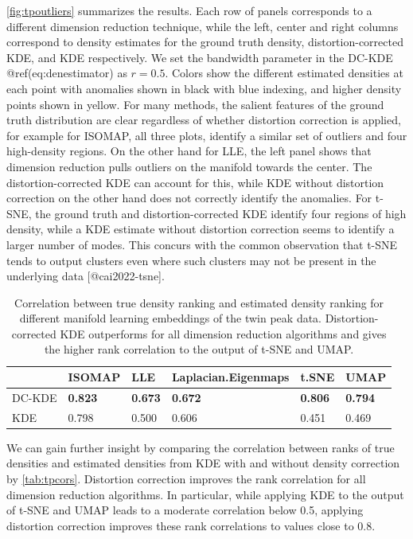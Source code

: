 \documentclass[
]{article}
\begin{document}
\autoref{fig:tpoutliers} summarizes the results. Each row of panels
corresponds to a different dimension reduction technique, while the
left, center and right columns correspond to density estimates for the
ground truth density, distortion-corrected KDE, and KDE respectively. We
set the bandwidth parameter in the DC-KDE @ref(eq:denestimator) as
\(r=0.5\). Colors show the different estimated densities at each point
with anomalies shown in black with blue indexing, and higher density
points shown in yellow. For many methods, the salient features of the
ground truth distribution are clear regardless of whether distortion
correction is applied, for example for ISOMAP, all three plots, identify
a similar set of outliers and four high-density regions. On the other
hand for LLE, the left panel shows that dimension reduction pulls
outliers on the manifold towards the center. The distortion-corrected
KDE can account for this, while KDE without distortion correction on the
other hand does not correctly identify the anomalies. For t-SNE, the
ground truth and distortion-corrected KDE identify four regions of high
density, while a KDE estimate without distortion correction seems to
identify a larger number of modes. This concurs with the common
observation that t-SNE tends to output clusters even where such clusters
may not be present in the underlying data {[}@cai2022-tsne{]}.

\begin{table}

\caption{\label{tab:tpcors}Correlation between true density ranking and estimated density ranking for different manifold learning embeddings of the twin peak data. Distortion-corrected KDE outperforms for all dimension reduction algorithms and gives the higher rank correlation to the output of t-SNE and UMAP.}
\centering
\begin{tabular}[t]{l>{}l>{}l>{}l>{}l>{}l}
\toprule
  & ISOMAP & LLE & Laplacian.Eigenmaps & t.SNE & UMAP\\
\midrule
DC-KDE & \textbf{0.823} & \textbf{0.673} & \textbf{0.672} & \textbf{0.806} & \textbf{0.794}\\
KDE & 0.798 & 0.500 & 0.606 & 0.451 & 0.469\\
\bottomrule
\end{tabular}
\end{table}

We can gain further insight by comparing the correlation between ranks
of true densities and estimated densities from KDE with and without
density correction by \autoref{tab:tpcors}. Distortion correction
improves the rank correlation for all dimension reduction algorithms. In
particular, while applying KDE to the output of t-SNE and UMAP leads to
a moderate correlation below 0.5, applying distortion correction
improves these rank correlations to values close to 0.8.
\end{document}
